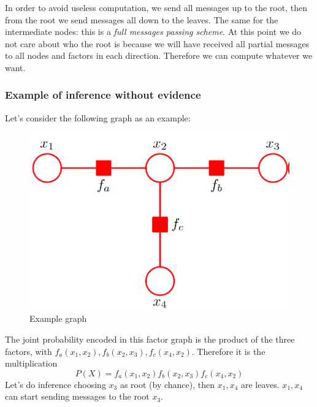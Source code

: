             
            In order to avoid useless computation, we send all messages up to the root, then from the root we send messages all down to the leaves. The same for the intermediate nodes: this is a \textit{full messages passing scheme}. At this point we do not care about who the root is because we will have received all partial messages to all nodes and factors in each direction. 
            Therefore we can compute whatever we want.\\
            
            \subsubsection{Example of inference without evidence}
            Let's consider the following graph as an example:
            \begin{figure}[ht]
                \centering
                \includegraphics[scale=0.25]{images/example_inference_BN.png}
                \caption{Example graph}
                \label{fig:example_graph_inference_BN}
            \end{figure}
            The joint probability encoded in this factor graph is the product of the three factors, with $f_a(x_1, x_2), f_b(x_2, x_3), f_c(x_4, x_2)$. Therefore it is the multiplication
            $$P(X) = f_a(x_1, x_2) f_b(x_2, x_3) f_c(x_4, x_2)$$
            Let's do inference choosing $x_3$ as root (by chance), then $x_1, x_4$ are leaves.  $x_1, x_4$ can start sending messages to the root $x_3$. 
